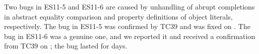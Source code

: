Two bugs in ES11-5 and ES11-6 are caused by unhandling of abrupt completions in
abstract equality comparison and property definitions of object literals, respectively.  
The bug in ES11-5 was confirmed by TC39 and was fixed on .
The bug in ES11-6 was a genuine one, and we reported it and received a confirmation
from TC39 on ; the bug lasted for  days.
